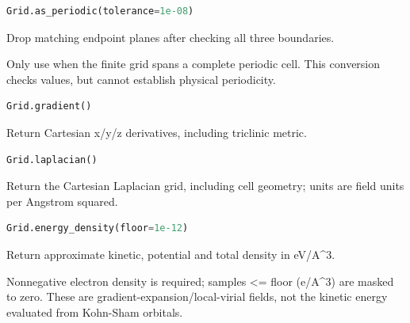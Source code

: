 \begin{samepage}

\begin{lstlisting}[language=Python]
Grid.as_periodic(tolerance=1e-08)
\end{lstlisting}

Drop matching endpoint planes after checking all three boundaries.

Only use when the finite grid spans a complete periodic cell. This
conversion checks values, but cannot establish physical periodicity.

\end{samepage}



\begin{samepage}

\begin{lstlisting}[language=Python]
Grid.gradient()
\end{lstlisting}

Return Cartesian x/\allowbreak{}y/\allowbreak{}z derivatives, including triclinic metric.

\end{samepage}



\begin{samepage}

\begin{lstlisting}[language=Python]
Grid.laplacian()
\end{lstlisting}

Return the Cartesian Laplacian grid, including cell geometry; units are field units per Angstrom squared.

\end{samepage}



\begin{samepage}

\begin{lstlisting}[language=Python]
Grid.energy_density(floor=1e-12)
\end{lstlisting}

Return approximate kinetic, potential and total density in eV/\allowbreak{}A\textasciicircum{}3.

Nonnegative electron density is required; samples <= floor (e/\allowbreak{}A\textasciicircum{}3)
are masked to zero. These are gradient-expansion/\allowbreak{}local-virial fields,
not the kinetic energy evaluated from Kohn-Sham orbitals.

\end{samepage}




